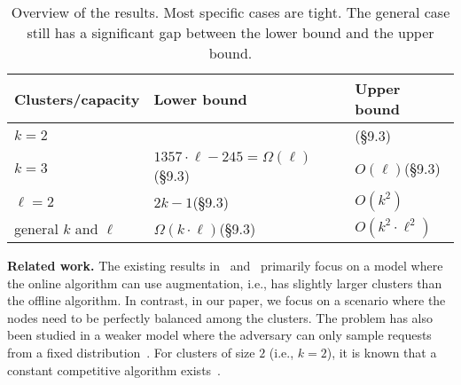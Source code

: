 \documentclass[manuscript,screen=true, review, anonymous]{acmart}
\begin{document}
\begin{table*}
  \centering
  \renewcommand{\arraystretch}{1.5}
    \begin{tabular}{>{\centering\arraybackslash}p{4.5cm}|>{\centering\arraybackslash}p{4.5cm}>{\centering\arraybackslash}p{4.5cm}}
    \rowcolor{gray!50}
    \textbf{Clusters/capacity} & \textbf{ Lower bound} &\textbf{Upper bound}\\ \hline 
      \textbf{$k=2$}& 3\hspace{0.3cm}\cite{repartition-disc} & 3\hspace{0.3cm}(\S 9.3) \\ 
      \rowcolor{gray!25}
      \textbf{$k=3$}&  $1357\cdot \ell - 245 = \Omega(\ell)$\hspace{0.3cm}(\S 9.3)& $O(\ell)$\hspace{0.3cm}(\S 9.3)\\
      \textbf{$\ell=2$}&  $2k-1$\hspace{0.3cm}(\S 9.3)&\hspace{0.3cm}$O(k^2)$\hspace{0.3cm}\cite{repartition-disc}\\
      \rowcolor{gray!25}
      general $k$ and $\ell$& $\Omega(k\cdot \ell)$\hspace{0.3cm}(\S 9.3)&$O(k^2 \cdot \ell^2)$\hspace{0.3cm}\cite{repartition-disc} \\
    \end{tabular}
                \caption{Overview of the results. Most specific cases are tight. The general case still has a significant gap between the lower bound and the upper bound.
                  }
  \label{tab:overview}
  \vspace{-7mm}
\end{table*}

\noindent \textbf{Related work.}
The existing results in~\cite{repartition-disc}
and~\cite{sigmetrics19_partitioning}
primarily focus on a model where 
the online algorithm can use augmentation,
i.e., has slightly larger clusters than the offline 
algorithm. In contrast, in our paper, we focus
on a scenario where the nodes need to be
perfectly balanced among the clusters.
The problem has also been studied in a weaker
model where the adversary can only sample
requests from a fixed distribution~\cite{stochastic-ring}.
For clusters of size $2$ (i.e., $k=2$), 
it is known that a constant competitive algorithm exists~\cite{repartition-disc}.

\end{document}
